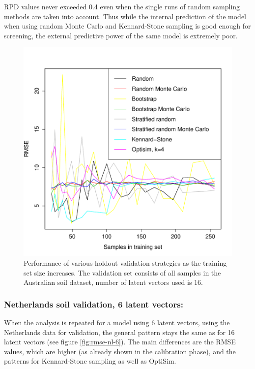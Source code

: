 \documentclass{isprs}
\begin{document}
RPD values never exceeded 0.4 even when the single runs of random sampling methods are taken into account. Thus while the internal prediction of the model when using random Monte Carlo and Kennard-Stone sampling is good enough for screening, the external predictive power of the same model is extremely poor.

\begin{figure}[ht!]
\includegraphics[width=1.0\columnwidth]{../script/output/rmse-au-16.pdf}
\begin{center}
    \caption{Performance of various holdout validation strategies as the training set size increases. The validation set consists of all samples in the Australian soil dataset, number of latent vectors used is 16.}
    \label{fig:rmse-au-16}
\end{center}
\end{figure}

\subsubsection{Netherlands soil validation, 6 latent vectors:}\label{sec:NL6}

When the analysis is repeated for a model using 6 latent vectors, using the Netherlands data for validation, the general pattern stays the same as for 16 latent vectors (see figure \ref{fig:rmse-nl-6}). The main differences are the RMSE values, which are higher (as already shown in the calibration phase), and the patterns for Kennard-Stone sampling as well as OptiSim.
\end{document}
